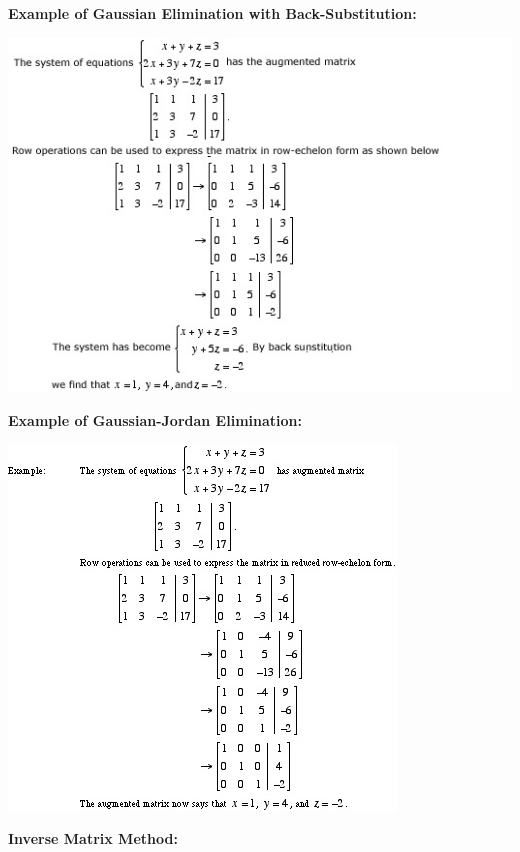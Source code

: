 \documentclass[12pt]{article}
\begin{document}
\textbf{Example of Gaussian Elimination with Back-Substitution:}

\centerline{\includegraphics{GaussianElimination.jpg}}

\newpage

\textbf{Example of Gaussian-Jordan Elimination:}

\centerline{\includegraphics{GaussElim.jpg}}

\textbf{Inverse Matrix Method:}
\end{document}
